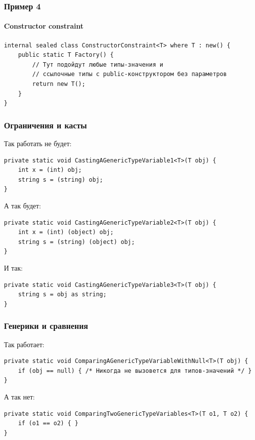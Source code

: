 \documentclass[xetex,mathserif,serif]{beamer}
\begin{document}
	\begin{frame}[fragile]
		\frametitle{Пример 4}
		\framesubtitle{Constructor constraint}
		\begin{footnotesize}
			\begin{verbatim}
internal sealed class ConstructorConstraint<T> where T : new() {
    public static T Factory() {
        // Тут подойдут любые типы-значения и 
        // ссылочные типы с public-конструктором без параметров
        return new T();
    }
}
			\end{verbatim}
		\end{footnotesize}
	\end{frame}

	\begin{frame}[fragile]
		\frametitle{Ограничения и касты}
		Так работать не будет:
		\begin{footnotesize}
			\begin{verbatim}
private static void CastingAGenericTypeVariable1<T>(T obj) {
    int x = (int) obj; 
    string s = (string) obj;
}
			\end{verbatim}
		\end{footnotesize}
		\vspace{5mm}
		А так будет:
		\begin{footnotesize}
			\begin{verbatim}
private static void CastingAGenericTypeVariable2<T>(T obj) {
    int x = (int) (object) obj;
    string s = (string) (object) obj; 
}
			\end{verbatim}
		\end{footnotesize}
		\vspace{5mm}
		И так:
		\begin{footnotesize}
			\begin{verbatim}
private static void CastingAGenericTypeVariable3<T>(T obj) {
    string s = obj as string;
}
			\end{verbatim}
		\end{footnotesize}
	\end{frame}

	\begin{frame}[fragile]
		\frametitle{Генерики и сравнения}
		Так работает:
		\begin{footnotesize}
			\begin{verbatim}
private static void ComparingAGenericTypeVariableWithNull<T>(T obj) {
    if (obj == null) { /* Никогда не вызовется для типов-значений */ }
}
			\end{verbatim}
		\end{footnotesize}
		\vspace{5mm}
		А так нет:
		\begin{footnotesize}
			\begin{verbatim}
private static void ComparingTwoGenericTypeVariables<T>(T o1, T o2) {
    if (o1 == o2) { }
}
			\end{verbatim}
		\end{footnotesize}
	\end{frame}
\end{document}
